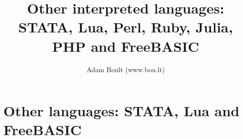 \documentclass[oneside]{book}
\begin{document}
\author{Adam Boult (www.bou.lt)}
\title{Other interpreted languages: STATA, Lua, Perl, Ruby, Julia, PHP and FreeBASIC}
\maketitle

\setcounter{tocdepth}{0}
\tableofcontents



\part{Other languages: STATA, Lua and FreeBASIC}




\end{document}
